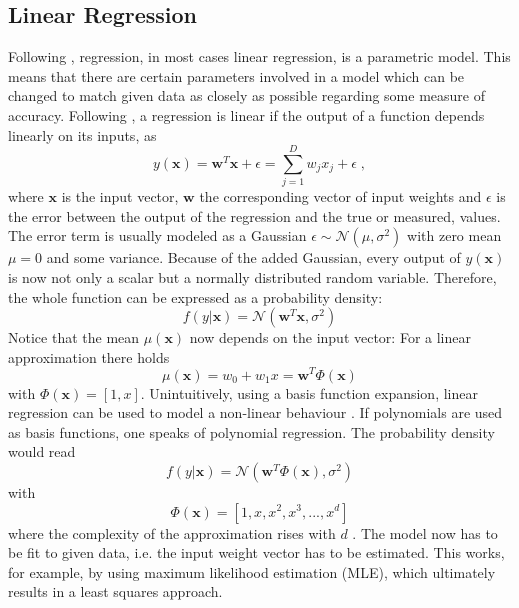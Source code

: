 \documentclass[%
  a4paper,oneside,%
  11pt,%
  smallchapters,
  style=printdev,
  extramargin,
  green,%
  rgb, <cmyk>
  ]{tubsbook}
\begin{document}
\subsection{Linear Regression}
Following \cite{murphy2012}, regression, in most cases linear regression, is a parametric model. This means that there are certain parameters involved in a model which can be changed to match given data as closely as possible regarding some measure of accuracy. Following \cite[p. 19]{murphy2012}, a regression is linear if the output of a function depends linearly on its inputs, as 
%
\begin{equation}
y(\bm{x}) = \bm{w}^T \bm{x} + \epsilon = \sum_{j = 1}^D w_jx_j + \epsilon \;,
\label{eqn:linReg}
\end{equation}
%
where $\bm{x}$ is the input vector, $\bm{w}$ the corresponding vector of input weights and $\epsilon$ is the error between the output of the regression and the true or measured, values. The error term is usually modeled as a Gaussian $\epsilon \sim \mathcal{N}(\mu,\sigma^2)$ with zero mean $\mu = 0$ and some variance. Because of the added Gaussian, every output of $y(\bm{x})$ is now not only a scalar but a normally distributed random variable. Therefore, the whole function can be expressed as a probability density:
%
\begin{equation}
f(y|\bm{x}) = \mathcal{N}(\bm{w}^T\bm{x},\sigma^2)
\end{equation}
%
Notice that the mean $\mu(\bm{x})$ now depends on the input vector: For a linear approximation there holds
\begin{equation}
\mu (\bm{x}) = w_0 + w_1x= \bm{w}^T\Phi(\bm{x}) 
\end{equation}
with $\Phi(\bm{x}) = [1,x]$. 
Unintuitively, using a basis function expansion, linear regression can be used to model a non-linear behaviour \cite[p. 20]{murphy2012}. If polynomials are used as basis functions, one speaks of polynomial regression. The probability density would read
\begin{equation}
f(y|\bm{x}) = \mathcal{N}(\bm{w}^T\Phi(\bm{x}),\sigma^2)
\end{equation}
with 
\begin{equation}
\Phi(\bm{x}) = [1,x,x^2,x^3,...,x^d]
\end{equation}
where the complexity of the approximation rises with $d$ \cite[p. 20]{murphy2012}. 
The model now has to be fit to given data, i.e. the input weight vector has to be estimated. This works, for example, by using maximum likelihood estimation (MLE), which ultimately results in a least squares approach.
\end{document}
